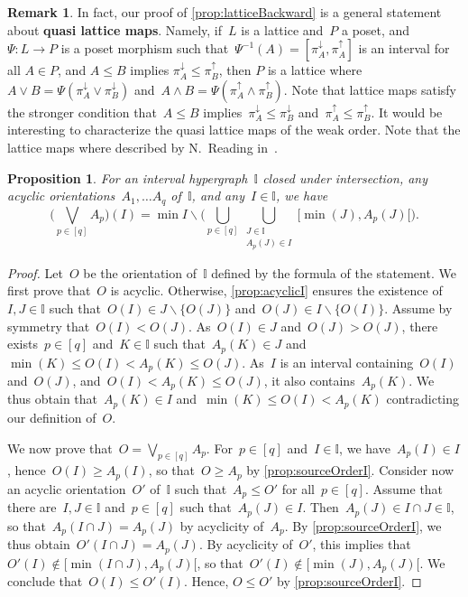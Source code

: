 \documentclass[reqno]{amsart}
\newtheorem{proposition}[theorem]{Proposition}
\theoremstyle{definition}
\newtheorem{remark}[theorem]{Remark}
\newcommand{\ssm}{\smallsetminus} %
\newcommand{\defn}[1]{\textbf{\textsf{\color{PineGreen} #1}}} %
\newcommand{\meet}{\wedge} %
\newcommand{\join}{\vee} %
\newcommand{\bigJoin}{\bigvee} %
\newcommand{\projDown}{\pi^\downarrow} %
\newcommand{\projUp}{\pi^\uparrow} %
\newcommand{\II}{\mathbb I} %
\begin{document}
\begin{remark}
In fact, our proof of \cref{prop:latticeBackward} is a general statement about \defn{quasi lattice maps}.
Namely, if~$L$ is a lattice and~$P$ a poset, and $\Psi : L \to P$ is a poset morphism such that~$\Psi^{-1}(A) = [\projDown_A, \projUp_A]$ is an interval  for all $A\in P$, and $A \le B$ implies $\projDown_A \le \projUp_B$, then $P$ is a lattice where~$A \join B =\Psi(\projDown_A \join \projDown_B)$ and~$A \meet B =\Psi(\projUp_A \meet \projUp_B)$.
Note that lattice maps satisfy the stronger condition that~$A \le B$ implies~$\projDown_A \le \projDown_B$ and~$\projUp_A \le \projUp_B$.
It would be interesting to characterize the quasi lattice maps of the weak order.
Note that the lattice maps where described by N.~Reading in~\cite{Reading-latticeCongruences, Reading-arcDiagrams}.
\end{remark}

\begin{proposition}
\label{prop:joinLattice}
For an interval hypergraph~$\II$ closed under intersection, any acyclic orientations~$A_1, \dots A_q$ of~$\II$, and any~${I \in \II}$, we have
\[
\Big( \bigJoin_{p \in [q]} A_p \Big)(I) = \min I \ssm \Big( \bigcup_{p \in [q]} \bigcup_{\substack{J \in \II \\ A_p(J) \in I}} {[\min(J), A_p(J)[} \Big).
\]
\end{proposition}

\begin{proof}
Let~$O$ be the orientation of~$\II$ defined by the formula of the statement.
We first prove that~$O$ is acyclic.
Otherwise, \cref{prop:acyclicI} ensures the existence of~$I,J \in \II$ such that~$O(I) \in J \ssm \{O(J)\}$ and~$O(J) \in I \ssm \{O(I)\}$.
Assume by symmetry that~$O(I) < O(J)$.
As~$O(I) \in J$ and~$O(J) > O(J)$, there exists~$p \in [q]$ and~$K \in \II$ such that~$A_p(K) \in J$ and~$\min(K) \le O(I) < A_p(K) \le O(J)$.
As~$I$ is an interval containing~$O(I)$ and~$O(J)$, and~$O(I) < A_p(K) \le O(J)$, it also contains~$A_p(K)$.
We thus obtain that~$A_p(K) \in I$ and~$\min(K) \le O(I) < A_p(K)$ contradicting our definition of~$O$.

We now prove that~$O = \bigJoin_{p \in [q]} A_p$.
For~$p \in [q]$ and~$I \in \II$, we have~$A_p(I) \in I$, hence~${O(I) \ge A_p(I)}$, so that~$O \ge A_p$ by \cref{prop:sourceOrderI}.
Consider now an acyclic orientation~$O'$ of~$\II$ such that~$A_p \le O'$ for all~$p \in [q]$.
Assume that there are~$I, J \in \II$ and~$p \in [q]$ such that~$A_p(J) \in I$.
Then~$A_p(J) \in I \cap J \in \II$, so that~$A_p(I \cap J) = A_p(J)$ by acyclicity of~$A_p$.
By \cref{prop:sourceOrderI}, we thus obtain~$O'(I \cap J) = A_p(J)$.
By acyclicity of~$O'$, this implies that~$O'(I) \notin {[\min(I \cap J), A_p(J)[}$, so that~$O'(I) \notin [\min(J), A_p(J)[$.
We conclude that~$O(I) \le O'(I)$.
Hence, $O \le O'$ by \cref{prop:sourceOrderI}.
\end{proof}
\end{document}
